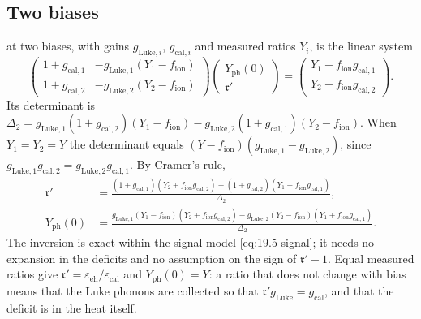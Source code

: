 \subsection{Two biases}

 at two biases, with gains $g_{\mathrm{Luke},i}$, $g_{\mathrm{cal},i}$ and measured ratios $Y_i$, is the linear system
\begin{equation*}
  \begin{pmatrix} 1 + g_{\mathrm{cal},1} & -g_{\mathrm{Luke},1}(Y_1 - f_{\mathrm{ion}}) \\ 1 + g_{\mathrm{cal},2} & -g_{\mathrm{Luke},2}(Y_2 - f_{\mathrm{ion}}) \end{pmatrix}
  \begin{pmatrix} Y_{\mathrm{ph}}(0) \\ \mathfrak{r}' \end{pmatrix} =
  \begin{pmatrix} Y_1 + f_{\mathrm{ion}}g_{\mathrm{cal},1} \\ Y_2 + f_{\mathrm{ion}}g_{\mathrm{cal},2} \end{pmatrix} .
\end{equation*}
Its determinant is $\Delta_2 = g_{\mathrm{Luke},1}(1 + g_{\mathrm{cal},2})(Y_1 - f_{\mathrm{ion}}) - g_{\mathrm{Luke},2}(1 + g_{\mathrm{cal},1})(Y_2 - f_{\mathrm{ion}})$. When $Y_1 = Y_2 = Y$ the determinant equals $(Y - f_{\mathrm{ion}})(g_{\mathrm{Luke},1} - g_{\mathrm{Luke},2})$, since $g_{\mathrm{Luke},1}g_{\mathrm{cal},2} = g_{\mathrm{Luke},2}g_{\mathrm{cal},1}$. By Cramer's rule,
\begin{equation}
\begin{split}
  \mathfrak{r}' &= \frac{(1 + g_{\mathrm{cal},1})(Y_2 + f_{\mathrm{ion}}g_{\mathrm{cal},2}) - (1 + g_{\mathrm{cal},2})(Y_1 + f_{\mathrm{ion}}g_{\mathrm{cal},1})}{\Delta_2} , \\
  Y_{\mathrm{ph}}(0) &= \frac{g_{\mathrm{Luke},1}(Y_1 - f_{\mathrm{ion}})(Y_2 + f_{\mathrm{ion}}g_{\mathrm{cal},2}) - g_{\mathrm{Luke},2}(Y_2 - f_{\mathrm{ion}})(Y_1 + f_{\mathrm{ion}}g_{\mathrm{cal},1})}{\Delta_2} .
\end{split}
  \label{eq:D.45-inversion}
\end{equation}
The inversion is exact within the signal model \cref{eq:19.5-signal}; it needs no expansion in the deficits and no assumption on the sign of $\mathfrak{r}' - 1$. Equal measured ratios give $\mathfrak{r}' = \varepsilon_{\mathrm{eh}}/\varepsilon_{\mathrm{cal}}$ and $Y_{\mathrm{ph}}(0) = Y$: a ratio that does not change with bias means that the Luke phonons are collected so that $\mathfrak{r}'g_{\mathrm{Luke}} = g_{\mathrm{cal}}$, and that the deficit is in the heat itself.
